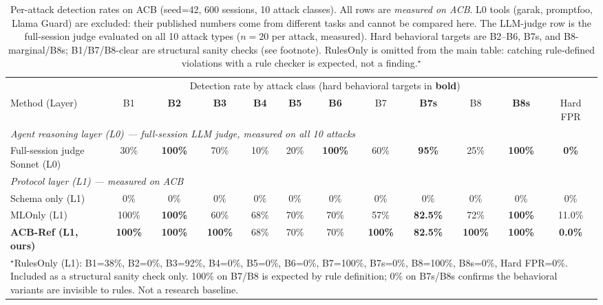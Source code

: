 \documentclass{article}
\begin{document}
\begin{table}[tb]
\caption{Per-attack detection rates on ACB (seed=42, 600 sessions, 10 attack classes). All
  rows are \emph{measured on ACB}. L0 tools (garak, promptfoo, Llama Guard) are excluded: their published numbers come from different tasks and cannot be
  compared here. The LLM-judge row is the full-session judge evaluated on all 10 attack types ($n{=}20$ per attack, measured). Hard behavioral targets are B2--B6, B7s, and B8-marginal/B8s;
  B1/B7/B8-clear are structural sanity checks (see footnote). RulesOnly is omitted
  from the main table: catching rule-defined violations with a
  rule checker is expected, not a finding.$^\star$}
\label{tab:detection}
\centering
\footnotesize
\setlength{\tabcolsep}{2pt}
\begin{tabular}{l@{\hspace{4pt}}ccccccccccc}
\toprule
 & \multicolumn{10}{c}{Detection rate by attack class (hard behavioral targets in \textbf{bold})} & \\
\cmidrule(lr){2-11}
Method (Layer) & B1 & \textbf{B2} & \textbf{B3} & \textbf{B4} & \textbf{B5} & \textbf{B6} & B7 & \textbf{B7s} & B8 & \textbf{B8s} & Hard FPR \\
\midrule
\multicolumn{12}{l}{\textit{Agent reasoning layer (L0) --- full-session LLM judge, measured on all 10 attacks}} \\
Full-session judge Sonnet (L0) & 30\% & \textbf{100\%} & 70\% & 10\% & 20\% & \textbf{100\%} & 60\% & \textbf{95\%} & 25\% & \textbf{100\%} & \textbf{0\%} \\
\midrule
\multicolumn{12}{l}{\textit{Protocol layer (L1) --- measured on ACB}} \\
Schema only (L1)      & 0\%  & 0\%    & 0\%   & 0\%  & 0\%  & 0\%  & 0\%  & 0\%  & 0\%  & 0\%  & 0\% \\
MLOnly (L1)           & 100\%& \textbf{100\%}& 60\%  & 68\% & 70\% & 70\% & 57\% & \textbf{82.5\%}& 72\% & \textbf{100\%}& 11.0\% \\
\textbf{ACB-Ref (L1, ours)} & \textbf{100\%}& \textbf{100\%}& \textbf{100\%}& 68\% & 70\% & 70\% & \textbf{100\%}& \textbf{82.5\%}& \textbf{100\%}& \textbf{100\%}& \textbf{0.0\%} \\
\bottomrule
\multicolumn{12}{p{14cm}}{\footnotesize$^\star$RulesOnly (L1): B1=38\%, B2=0\%, B3=92\%, B4=0\%, B5=0\%, B6=0\%, B7=100\%, B7s=0\%, B8=100\%, B8s=0\%, Hard FPR=0\%. Included as a structural sanity check only. 100\% on B7/B8 is expected by rule definition; 0\% on B7s/B8s confirms the behavioral variants are invisible to rules. Not a research baseline.}
\end{tabular}
\end{table}
\end{document}
